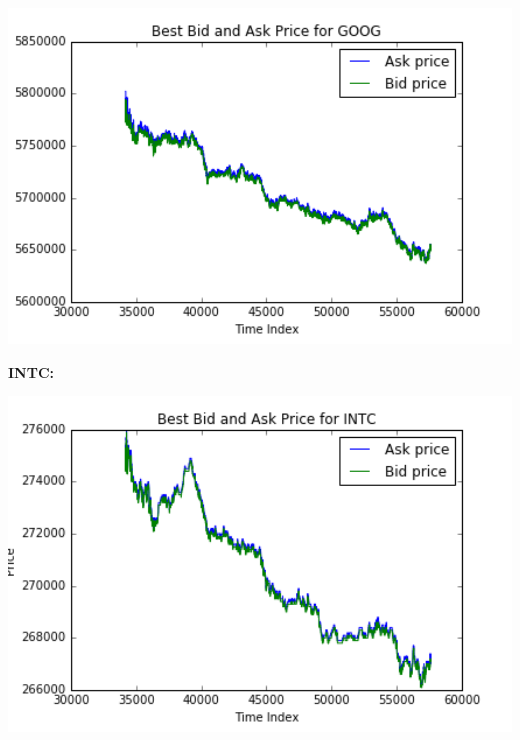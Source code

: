 \documentclass[xcolor={x11names,svgnames,dvipsnames}]{beamer}
\begin{document}
\begin{frame}
\begin{columns}
\begin{column}{.5\textwidth}
									\includegraphics[width=1\textwidth, height=0.4\textheight]{GOOG_price.png}

			 \textbf{INTC:}
	
										\includegraphics[width=1\textwidth, height=0.4\textheight]{INTC_price.png}

		\end{column}
	\end{columns}

\end{frame}
\end{document}
